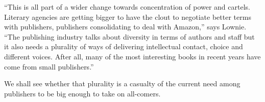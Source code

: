 ``This is all part of a wider change towards concentration of power and cartels. Literary agencies are getting bigger to have the clout to negotiate better terms with publishers, publishers consolidating to deal with Amazon,'' says Lownie. ``The publishing industry talks about diversity in terms of authors and staff but it also needs a plurality of ways of delivering intellectual contact, choice and different voices. After all, many of the most interesting books in recent years have come from small publishers.''


We shall see whether that plurality is a casualty of the current need among publishers to be big enough to take on all-comers.